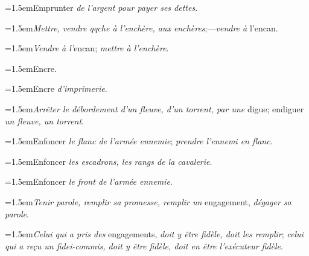 \par{\dictfontsize\hangindent=1.5em\noindent Emprunter \textit{de l’argent pour payer ses dettes}. \par}
\par{\dictfontsize\hangindent=1.5em\noindent \textit{Mettre, vendre qqche à l’enchère, aux enchères};—\textit{vendre à} l’encan. \par}
\par{\dictfontsize\hangindent=1.5em\noindent \textit{Vendre à l’}encan; \textit{mettre à l’enchère}. \par}
\par{\dictfontsize\hangindent=1.5em\noindent Encre. \par}
\par{\dictfontsize\hangindent=1.5em\noindent Encre \textit{d’imprimerie}. \par}
\par{\dictfontsize\hangindent=1.5em\noindent \textit{Arrêter le débordement d’un fleuve, d’un torrent, par une} digue; endiguer \textit{un fleuve, un torrent}. \par}
\par{\dictfontsize\hangindent=1.5em\noindent Enfoncer \textit{le flanc de l’armée ennemie}; \textit{prendre l’ennemi en flanc}. \par}
\par{\dictfontsize\hangindent=1.5em\noindent Enfoncer \textit{les escadrons, les rangs de la cavalerie}. \par}
\par{\dictfontsize\hangindent=1.5em\noindent Enfoncer \textit{le front de l’armée ennemie}. \par}
\par{\dictfontsize\hangindent=1.5em\noindent \textit{Tenir parole, remplir sa promesse, remplir un} engagement, \textit{dégager sa parole}. \par}
\par{\dictfontsize\hangindent=1.5em\noindent \textit{Celui qui a pris des} engagements, \textit{doit y être fidèle, doit les remplir}; \textit{celui qui a reçu un fidei-commis, doit y être fidèle, doit en être l’exécuteur fidèle}. \par}
